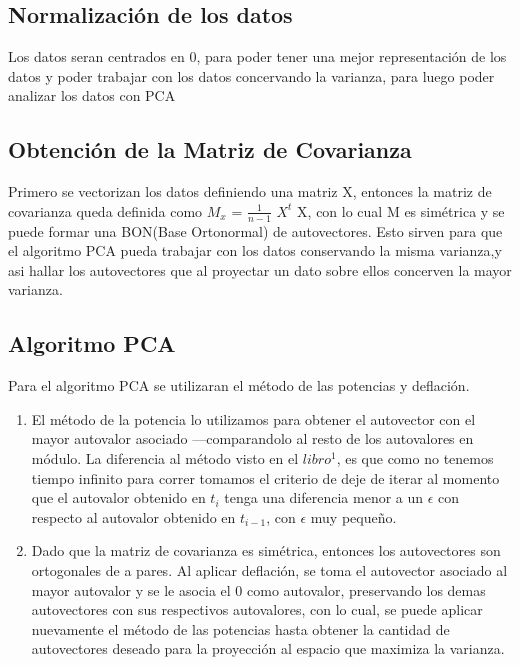 \subsection{Normalización de los datos}
Los datos seran centrados en 0, para poder tener una mejor representación de los
datos y poder trabajar con los datos concervando la varianza, para luego poder analizar
los datos con PCA

\subsection{Obtención de la Matriz de Covarianza}
Primero se vectorizan los datos definiendo una matriz X, entonces la matriz de
covarianza queda definida como $M_{x}$ = $\frac{1}{n-1}$ $X^{t}$ X, con lo cual
M es simétrica y se puede formar una BON(Base Ortonormal) de autovectores. Esto sirven
para que el algoritmo PCA pueda trabajar con los datos conservando la misma varianza,y asi hallar los autovectores que al proyectar un dato sobre
ellos concerven la mayor varianza.

\subsection{Algoritmo PCA}
Para el algoritmo PCA se utilizaran el método de las potencias y deflación. 
\begin{enumerate}
\item El método de la potencia lo utilizamos para obtener el autovector con el mayor autovalor asociado ---comparandolo al resto de los autovalores en módulo. La diferencia al método visto en el $libro^{1}$, es que como no tenemos tiempo infinito para correr tomamos el criterio de deje de iterar al momento que el autovalor obtenido en $t_{i}$ tenga una diferencia menor a un $\epsilon$ con respecto al autovalor obtenido en $t_{i-1}$, con $\epsilon$ muy pequeño.
\item Dado que la matriz de covarianza es simétrica, entonces los autovectores son ortogonales de a pares. Al aplicar deflación, se toma el autovector asociado al mayor autovalor y se le asocia el 0 como autovalor, preservando los demas autovectores con sus respectivos autovalores, con lo cual, se puede aplicar nuevamente el método de las potencias hasta obtener la cantidad de autovectores deseado para la proyección al espacio que maximiza la varianza.

\end{enumerate}



